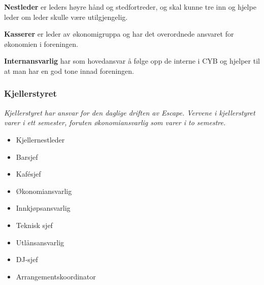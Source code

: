 \documentclass[12pt, norsk, a4paper]{proc}
\providecommand{\tightlist}{%
  \setlength{\itemsep}{0pt}\setlength{\parskip}{0pt}}
\begin{document}
\textbf{Nestleder} er leders høyre
hånd og stedfortreder, og skal kunne tre inn og hjelpe leder om leder skulle være
utilgjengelig. 



\textbf{Kasserer} er leder av økonomigruppa og har det overordnede ansvaret for økonomien i
foreningen. 



\textbf{Internansvarlig} har som hovedansvar å følge opp de interne i
CYB og hjelper til at man har en god tone innad foreningen.





\hypertarget{kjellerstyret}{%
\subsubsection*{Kjellerstyret}\label{kjellerstyret}}

\emph{Kjellerstyret har ansvar for den daglige driften av Escape.
Vervene i kjellerstyret varer i ett semester, foruten økonomiansvarlig 
som varer i to semestre.}

\begin{itemize}
\tightlist
\item
  Kjellernestleder
\item
  Barsjef
\item
  Kafésjef
\item
  Økonomiansvarlig %
\item
  Innkjøpsansvarlig
\item
  Teknisk sjef
\item
  Utlånsansvarlig
\item
  DJ-sjef
\item
  Arrangementskoordinator
\end{itemize}
\end{document}
